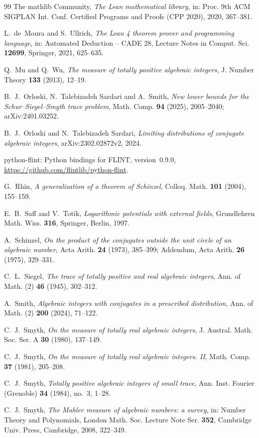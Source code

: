 \documentclass[11pt]{amsart}
\theoremstyle{remark}
\numberwithin{equation}{section}
\begin{document}
\begin{thebibliography}{99}
 The mathlib Community, \emph{The Lean mathematical library}, in: Proc. 9th ACM SIGPLAN Int. Conf. Certified Programs and Proofs (CPP 2020), 2020, 367--381.

 L.~de~Moura and S.~Ullrich, \emph{The Lean 4 theorem prover and programming language}, in: Automated Deduction -- CADE 28, Lecture Notes in Comput. Sci. \textbf{12699}, Springer, 2021, 625--635.

 Q.~Mu and Q.~Wu, \emph{The measure of totally positive algebraic integers}, J. Number Theory \textbf{133} (2013), 12--19.

 B.~J.~Orloski, N.~Talebizadeh Sardari and A.~Smith, \emph{New lower bounds for the Schur--Siegel--Smyth trace problem}, Math. Comp. \textbf{94} (2025), 2005--2040; arXiv:2401.03252.

 B.~J.~Orloski and N.~Talebizadeh Sardari, \emph{Limiting distributions of conjugate algebraic integers}, arXiv:2302.02872v2, 2024.

 python-flint: Python bindings for FLINT, version~0.9.0, \url{https://github.com/flintlib/python-flint}.

 G.~Rhin, \emph{A generalization of a theorem of Schinzel}, Colloq. Math. \textbf{101} (2004), 155--159.

 E.~B.~Saff and V.~Totik, \emph{Logarithmic potentials with external fields}, Grundlehren Math. Wiss. \textbf{316}, Springer, Berlin, 1997.

 A.~Schinzel, \emph{On the product of the conjugates outside the unit circle of an algebraic number}, Acta Arith. \textbf{24} (1973), 385--399; Addendum, Acta Arith. \textbf{26} (1975), 329--331.

 C.~L.~Siegel, \emph{The trace of totally positive and real algebraic integers}, Ann. of Math. (2) \textbf{46} (1945), 302--312.

 A.~Smith, \emph{Algebraic integers with conjugates in a prescribed distribution}, Ann. of Math. (2) \textbf{200} (2024), 71--122.

 C.~J.~Smyth, \emph{On the measure of totally real algebraic integers}, J. Austral. Math. Soc. Ser. A \textbf{30} (1980), 137--149.

 C.~J.~Smyth, \emph{On the measure of totally real algebraic integers. II}, Math. Comp. \textbf{37} (1981), 205--208.

 C.~J.~Smyth, \emph{Totally positive algebraic integers of small trace}, Ann. Inst. Fourier (Grenoble) \textbf{34} (1984), no.~3, 1--28.

 C.~J.~Smyth, \emph{The Mahler measure of algebraic numbers: a survey}, in: Number Theory and Polynomials, London Math. Soc. Lecture Note Ser. \textbf{352}, Cambridge Univ. Press, Cambridge, 2008, 322--349.

\end{thebibliography}
\end{document}
